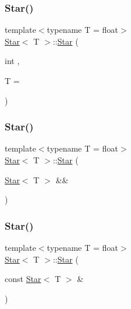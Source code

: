 \mbox{\label{classStar_aa179936ed93e38e70992cb4f6e3cbff3}} 
\subsubsection{\texorpdfstring{Star()}{Star()}\hspace{0.1cm}{\footnotesize\ttfamily [6/8]}}
{\footnotesize\ttfamily template$<$typename T  = float$>$ \\
\mbox{\hyperlink{classStar}{Star}}$<$ T $>$\+::\mbox{\hyperlink{classStar}{Star}} (\begin{DoxyParamCaption}\item[{int}]{,  }\item[{T}]{ = {} }\end{DoxyParamCaption})}

\mbox{\label{classStar_af518471484341cad6b47ad42d4e637fe}} 
\subsubsection{\texorpdfstring{Star()}{Star()}\hspace{0.1cm}{\footnotesize\ttfamily [7/8]}}
{\footnotesize\ttfamily template$<$typename T  = float$>$ \\
\mbox{\hyperlink{classStar}{Star}}$<$ T $>$\+::\mbox{\hyperlink{classStar}{Star}} (\begin{DoxyParamCaption}\item[{\mbox{\hyperlink{classStar}{Star}}$<$ T $>$ \&\&}]{ }\end{DoxyParamCaption})\hspace{0.3cm}{\ttfamily [default]}}

\mbox{\label{classStar_a047ce2a8d4fb409858555aee98b33c93}} 
\subsubsection{\texorpdfstring{Star()}{Star()}\hspace{0.1cm}{\footnotesize\ttfamily [8/8]}}
{\footnotesize\ttfamily template$<$typename T  = float$>$ \\
\mbox{\hyperlink{classStar}{Star}}$<$ T $>$\+::\mbox{\hyperlink{classStar}{Star}} (\begin{DoxyParamCaption}\item[{const \mbox{\hyperlink{classStar}{Star}}$<$ T $>$ \&}]{ }\end{DoxyParamCaption})\hspace{0.3cm}{\ttfamily [default]}}



